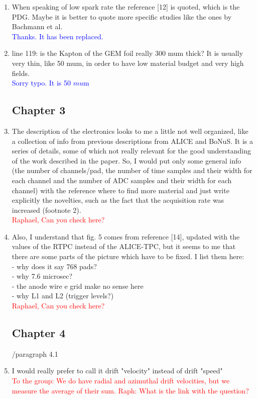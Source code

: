 \documentclass[a4paper,11pt,twoside]{article}
\begin{document}
\begin{enumerate}
\item When speaking of low spark rate the reference [12] is quoted, which is 
   the PDG. Maybe it is better to quote more specific studies like the ones by 
   Bachmann et al.\\
\textcolor{blue}{Thanks. It has been replaced.} 

\item line 119: is the Kapton of the GEM foil really 300 mum thick? It is 
   usually very thin, like 50 mum, in order to have low material budget and 
   very high fields.\\
\textcolor{blue}{Sorry typo. It is 50 $mu$m} 

\subsection*{ Chapter 3}
\item The description of the electronics looks to me a little not well 
   organized, like a collection of info from previous descriptions from ALICE 
   and BoNuS. It is a series of details, some of which not really relevant for 
   the good understanding of the work described in the paper. So, I would put 
   only some general info (the number of channels/pad, the number of time 
   samples and their width for each channel and the number of  ADC samples and 
   their width for each channel) with the reference where to find more material 
   and just write explicitly the novelties, such as the fact that the 
   acquisition rate was increased (footnote 2).\\
\textcolor{red}{Raphael, Can you check here?} 

\item Also, I understand that fig. 5 comes from reference [14], updated with 
   the values of the RTPC instead of the ALICE-TPC, but it seems to me that 
   there are some parts of the picture which have to be fixed. I list them 
   here:\\
- why does it say 768 pads?\\
- why 7.6 microsec?\\
- the anode wire e grid make no sense here\\
- why L1 and L2 (trigger levels?) \\
\textcolor{red}{Raphael, Can you check here? } 

\subsection*{ Chapter 4}
	/paragraph 4.1
\item I would really prefer to call it drift "velocity" instead of drift 
   "speed"\\
\textcolor{red}{To the group: We do have radial and azimuthal drift velocities, 
but we measure the average of their sum. Raph: What is the link with the question?} 


\end{enumerate}
\end{document}
